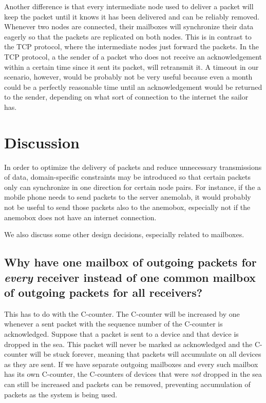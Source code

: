 \documentclass{article}
\begin{document}
Another difference is that every intermediate node used to deliver a packet will keep the packet until it knows it has been delivered and can be reliably removed. Whenever two nodes are connected, their mailboxes will synchronize their data eagerly so that the packets are replicated on both nodes. This is in contrast to the TCP protocol, where the intermediate nodes just forward the packets. In the TCP protocol, a the sender of a packet who does not receive an acknowledgement within a certain time since it sent its packet, will retransmit it. A timeout in our scenario, however, would be probably not be very useful because even a month could be a perfectly reasonable time until an acknowledgement would be returned to the sender, depending on what sort of connection to the internet the sailor has.

\section{Discussion}
In order to optimize the delivery of packets and reduce unnecessary transmissions of data, domain-specific constraints may be introduced so that certain packets only can synchronize in one direction for certain node pairs. For instance, if the a mobile phone needs to send packets to the server anemolab, it would probably not be useful to send those packets also to the anemobox, especially not if the anemobox does not have an internet connection.

We also discuss some other design decisions, especially related to mailboxes.

\subsection{Why have one mailbox of outgoing packets for \emph{every} receiver instead of one common mailbox of outgoing packets for all receivers?}
This has to do with the C-counter. The C-counter will be increased by one whenever a sent packet with the sequence number of the C-counter is acknowledged. Suppose that a packet is sent to a device and that device is dropped in the sea. This packet will never be marked as acknowledged and the C-counter will be stuck forever, meaning that packets will accumulate on all devices as they are sent. If we have separate outgoing mailboxes and every such mailbox has its own C-counter, the C-counters of devices that were \emph{not} dropped in the sea can still be increased and packets can be removed, preventing accumulation of packets as the system is being used.
\end{document}
